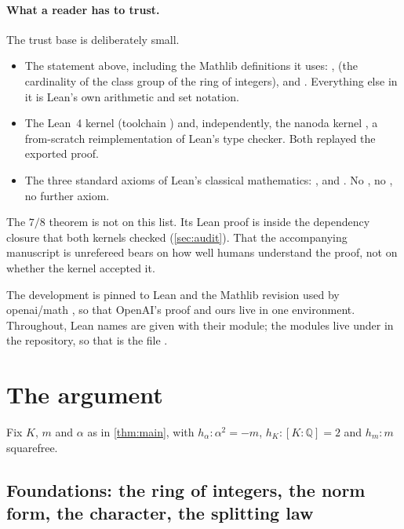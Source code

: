 \documentclass[11pt]{article}
\theoremstyle{definition}
\newcommand{\Q}{\mathbb{Q}}
\begin{document}
\paragraph{What a reader has to trust.} The trust base is deliberately small.
\begin{itemize}[nosep]
\item The statement above, including the Mathlib definitions it uses: ,  (the cardinality of the class group of the ring of integers),  and . Everything else in it is Lean's own arithmetic and set notation.
\item The Lean~4 kernel (toolchain ) and, independently, the nanoda kernel \cite{nanoda}, a from-scratch reimplementation of Lean's type checker. Both replayed the exported proof.
\item The three standard axioms of Lean's classical mathematics: ,  and . No , no , no further axiom.
\end{itemize}
The $7/8$ theorem is not on this list. Its Lean proof is inside the dependency closure that both kernels checked (\cref{sec:audit}). That the accompanying manuscript is unrefereed bears on how well humans understand the proof, not on whether the kernel accepted it.

The development is pinned to Lean  and the Mathlib revision  used by openai/math \cite{Mathlib2020,Lean4}, so that OpenAI's proof and ours live in one environment. Throughout, Lean names are given with their module; the modules live under  in the repository, so that  is the file .

\section{The argument}\label{sec:argument}

Fix $K$, $m$ and $\alpha$ as in \cref{thm:main}, with $h_\alpha : \alpha^2 = -m$, $h_K : [K:\Q] = 2$ and $h_m : m$ squarefree.

\subsection{Foundations: the ring of integers, the norm form, the character, the splitting law}\label{sec:foundations}
\end{document}
